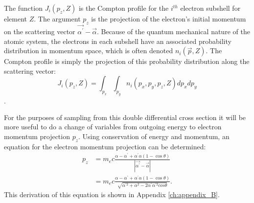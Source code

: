 The function $J_i(p_z,Z)$ is the Compton profile for the $i^{th}$ electron 
subshell for element $Z$. The argument $p_z$ is the projection of the 
electron's initial momentum on the scattering vector 
$\vec{\alpha^{'}} - \vec{\alpha}$. Because of the quantum mechanical nature of 
the atomic system, the electrons in each subshell have an associated 
probability distribution in momentum space, which is often denoted 
$n_i(\vec{p},Z)$. The Compton profile is simply the projection of this 
probability distribution along the scattering vector:
\begin{equation}
  J_i(p_z,Z) = \int_{p_x} \int_{p_y} n_i(p_x,p_y,p_z,Z)dp_xdp_y
\end{equation}
\citep{cooper_compton_1985}.

For the purposes of sampling from this double differential cross section it
will be more useful to do a change of variables from outgoing energy to 
electron momentum projection $p_z$. Using conservation of energy and momentum,
an equation for the electron momentum projection can be determined:
\begin{align}
  p_z & = m_ec \frac{\alpha - \alpha^{'} + \alpha^{'}\alpha(1 - \cos{\theta})}
  {\left|\vec{\alpha^{'}} - \vec{\alpha}\right|} \nonumber \\
  & = m_ec \frac{\alpha - \alpha^{'} + \alpha^{'}\alpha(1 - \cos{\theta})}
  {\sqrt{\alpha^{'2} + \alpha^{2} - 2\alpha^{'}\alpha^{'2}cos{\theta}}}.
  \label{eq:pz}
\end{align}
This derivation of this equation is shown in Appendix \ref{ch:appendix_B}. 

